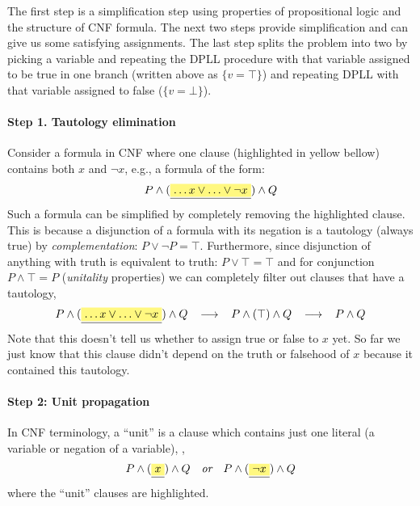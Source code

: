 The first step is a simplification step using properties
of propositional logic and the structure of CNF
formula. The next two steps provide simplification and can give us
some satisfying assignments.  The last step splits the problem into
two by picking a variable and repeating the DPLL procedure with that
variable assigned to be true in one branch (written above as $\{v = \top\}$)
and repeating DPLL with that variable assigned to false ($\{v = \bot\}$).

\paragraph{Step 1. Tautology elimination}

Consider a formula in CNF where one clause (highlighted in yellow
bellow) contains both $x$ and $\neg x$, e.g., a formula of
the form:
%
\begin{equation*}
P \wedge (\highlight{\ldots x \vee \ldots \vee \neg x}) \wedge Q
\end{equation*}
%
Such a formula can be simplified by completely removing the
highlighted clause. This is because a disjunction of a formula with
its negation is a tautology (always true) by \emph{complementation}:
 $P \vee \neg P = \top$.
Furthermore, since disjunction of anything with truth is equivalent to truth:
$P \vee \top = \top$ and for conjunction $P \wedge \top = P$
(\emph{unitality} properties) we can
completely filter out clauses that have a tautology, \ie{}
%
\begin{equation*}
P \wedge (\highlight{\ldots x \vee \ldots \vee \neg x}) \wedge Q
\;\;\; \longrightarrow \;\;\;
P \wedge (\top) \wedge Q
\;\;\; \longrightarrow \;\;\;
P \wedge Q
\end{equation*}
%
Note that this doesn't tell us whether to assign true or false to
$x$ yet. So far we just know that this clause didn't depend on the
truth or falsehood of $x$ because it contained this tautology.

\paragraph{Step 2: Unit propagation}

In CNF terminology, a ``unit'' is a clause which contains just one
literal (a variable or negation of a variable), \eg{},
%
\begin{equation*}
P \wedge (\highlight{x}) \wedge Q
\quad
\textit{or}
\quad
P \wedge (\highlight{\neg x}) \wedge Q
\end{equation*}
%
where the ``unit'' clauses are highlighted.

